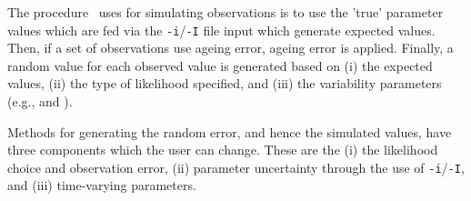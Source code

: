 
The procedure \CNAME\ uses for simulating observations is to use the 'true' parameter values which are fed via the \texttt{-i}/\texttt{-I} file input which generate expected values. Then, if a set of observations use ageing error, ageing error is applied. Finally, a random value for each observed value is generated based on (i) the expected values, (ii) the type of likelihood specified, and (iii) the variability parameters (e.g.,  and ).

Methods for generating the random error, and hence the simulated values, have three components which the user can change. These are the (i) the likelihood choice and observation error, (ii) parameter uncertainty through the use of \texttt{-i}/\texttt{-I}, and (iii) time-varying parameters. 

